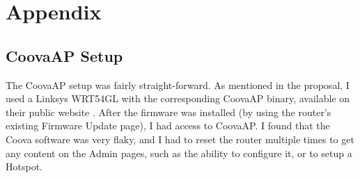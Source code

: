 \section{Appendix}
\label{section:appendix}

\subsection{CoovaAP Setup}
The CoovaAP setup was fairly straight-forward. As mentioned in the proposal, I used a Linksys
WRT54GL \cite{product:WRT54GL} with the corresponding CoovaAP binary, available on their public
website \cite{product:CoovaAPBin}. After the firmware was installed (by using the router's
existing Firmware Update page), I had access to CoovaAP. I found that the Coova software was very
flaky, and I had to reset the router multiple times to get any content on the Admin pages, such as
the ability to configure it, or to setup a Hotspot.